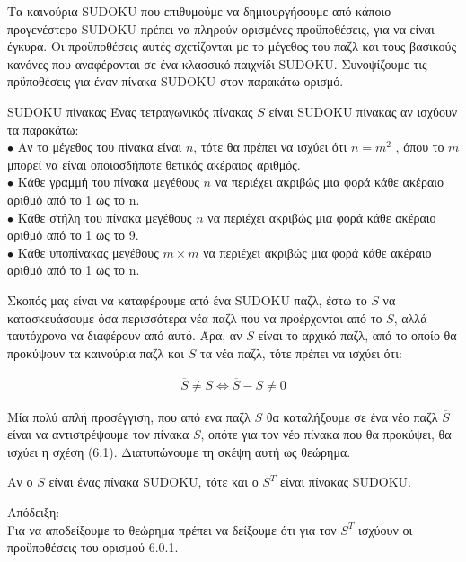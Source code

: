 \documentclass[12pt]{book}
\theoremstyle{definition}
\begin{document}
Τα καινούρια SUDOKU που επιθυμούμε να δημιουργήσουμε από κάποιο προγενέστερο SUDOKU πρέπει να πληρούν ορισμένες προϋποθέσεις, για να είναι έγκυρα. Οι προϋποθέσεις αυτές σχετίζονται με το μέγεθος του παζλ και τους βασικούς κανόνες που αναφέρονται σε ένα κλασσικό παιχνίδι SUDOKU. Συνοψίζουμε τις πρϋποθέσεις για έναν πίνακα SUDOKU στον παρακάτω ορισμό. \par

\begin{mytheorem}{SUDOKU πίνακας}{}
	Ένας τετραγωνικός πίνακας \(S\) είναι SUDOKU πίνακας αν ισχύουν τα παρακάτω: \\
	\(\bullet\) Αν το μέγεθος του πίνακα είναι \(n\), τότε θα πρέπει να ισχύει ότι \(n = m^{2}\) , όπου το \(m\) μπορεί να είναι οποιοσδήποτε θετικός ακέραιος αριθμός. \\
	\(\bullet\) Κάθε γραμμή του πίνακα μεγέθους \(n\) να περιέχει ακριβώς μια φορά κάθε ακέραιο αριθμό από το 1 ως το n. \\
	\(\bullet\) Κάθε στήλη του πίνακα μεγέθους \(n\) να περιέχει ακριβώς μια φορά κάθε ακέραιο αριθμό από το 1 ως το 9. \\
	\(\bullet\) Κάθε υποπίνακας μεγέθους \(m \times m\) να περιέχει ακριβώς μια φορά κάθε ακέραιο αριθμό από το 1 ως το n. \\
\end{mytheorem}

Σκοπός μας είναι να καταφέρουμε από ένα SUDOKU παζλ, έστω το \(S\) να κατασκευάσουμε όσα περισσότερα νέα παζλ που να προέρχονται από το \(S\), αλλά ταυτόχρονα να διαφέρουν από αυτό. Άρα, αν \(S\) είναι το αρχικό παζλ, από το οποίο θα προκύψουν τα καινούρια παζλ και \(\overline{S}\) τα νέα παζλ, τότε πρέπει να ισχύει ότι: 

\begin{align}
	\overline{S} \neq S \Leftrightarrow 
	\overline{S} - S \neq 0
\end{align}

Μία πολύ απλή προσέγγιση, που από ενα παζλ \(S\) θα καταλήξουμε σε ένα νέο παζλ \(\overline{S}\) είναι να αντιστρέψουμε τον πίνακα \(S\), οπότε για τον νέο πίνακα που θα προκύψει, θα ισχύει η σχέση (6.1). Διατυπώνουμε τη σκέψη αυτή ως θεώρημα. \par

\begin{theorem}{}{}
	Αν ο \(S\) είναι ένας πίνακα SUDOKU, τότε και ο \(S^{T}\) είναι πίνακας SUDOKU.
\end{theorem}

Απόδειξη: \\
Για να αποδείξουμε το θεώρημα πρέπει να δείξουμε ότι για τον \(S^{T}\) ισχύουν οι προϋποθέσεις του ορισμού 6.0.1. \\ \\
\end{document}
